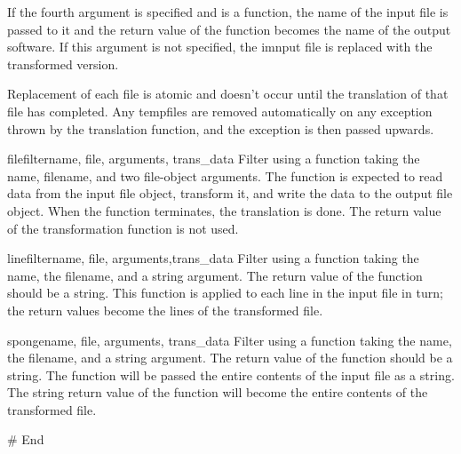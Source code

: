 If the fourth argument is specified and is a function, the name of the
input file is passed to it and the return value of the function
becomes the name of the output software.  If this argument is not
specified, the imnput file is replaced with the transformed version.

Replacement of each file is atomic and doesn't occur until the
translation of that file has completed.  Any tempfiles are removed
automatically on any exception thrown by the translation function,
and the exception is then passed upwards.

\begin{funcdesc}{filefilter}{name, file, arguments, trans_data}
Filter using a function taking the name, filename, and two file-object
arguments. The function is expected to read data from the input file
object, transform it, and write the data to the output file object.
When the function terminates, the translation is done.  The return
value of the transformation function is not used.
\end{funcdesc}

\begin{funcdesc}{linefilter}{name, file, arguments,trans_data}
Filter using a function taking the name, the filename, and a string
argument.  The return value of the function should be a string.  This
function is applied to each line in the input file in turn; the return
values become the lines of the transformed file.
\end{funcdesc}

\begin{funcdesc}{sponge}{name, file, arguments, trans_data}
Filter using a function taking the name, the filename, and a string
argument.  The return value of the function should be a string. The
function will be passed the entire contents of the input file as a
string.  The string return value of the function will become the
entire contents of the transformed file.
\end{funcdesc}

# End


